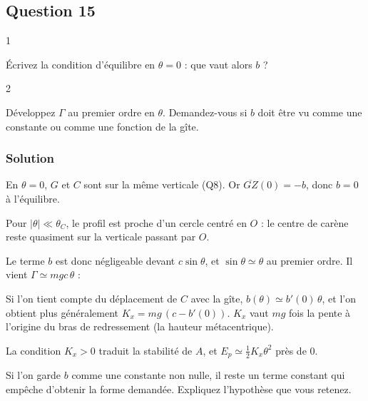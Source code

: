 \documentclass[11pt,a4paper]{article}
\newcommand{\equationajustee}[1]{%
  \sbox{\boiteequation}{$\displaystyle #1$}%
  \ifdim\wd\boiteequation>\linewidth
    \[\resizebox{\linewidth}{!}{\usebox{\boiteequation}}\]%
  \else
    \[#1\]%
  \fi}
\begin{document}
\hypertarget{question-15}{%
\subsection{Question 15}\label{question-15}}

\begin{indication}{1}

Écrivez la condition d'équilibre en \(\theta=0\) : que vaut alors \(b\) ?

\end{indication}

\begin{indication}{2}

Développez \(\Gamma\) au premier ordre en \(\theta\). Demandez-vous si \(b\) doit être vu comme une constante ou comme une fonction de la gîte.

\end{indication}

\hypertarget{solution-14}{%
\subsubsection{Solution}\label{solution-14}}

En \(\theta=0\), \(G\) et \(C\) sont sur la même verticale (Q8). Or \(\overline{GZ}(0)=-b\), donc \(b=0\) à l'équilibre.

Pour \(|\theta|\ll\theta_C\), le profil est proche d'un cercle centré en \(O\) : le centre de carène reste quasiment sur la verticale passant par \(O\).

Le terme \(b\) est donc négligeable devant \(c\sin\theta\), et \(\sin\theta\simeq\theta\) au premier ordre. Il vient \(\Gamma\simeq mgc\,\theta\) :

\equationajustee{\boxed{\begin{aligned}
C_f\ddot\theta&=C_m-K_x\theta\\
K_x&=mgc
\end{aligned}}}

Si l'on tient compte du déplacement de \(C\) avec la gîte, \(b(\theta)\simeq b'(0)\,\theta\), et l'on obtient plus généralement \(K_x=mg\,(c-b'(0))\). \(K_x\) vaut \(mg\) fois la pente à l'origine du bras de redressement (la hauteur métacentrique).

La condition \(K_x>0\) traduit la stabilité de \(A\), et \(E_p\simeq\frac12K_x\theta^2\) près de \(0\).

\begin{piege}

Si l'on garde \(b\) comme une constante non nulle, il reste un terme constant qui empêche d'obtenir la forme demandée. Expliquez l'hypothèse que vous retenez.

\end{piege}
\end{document}
